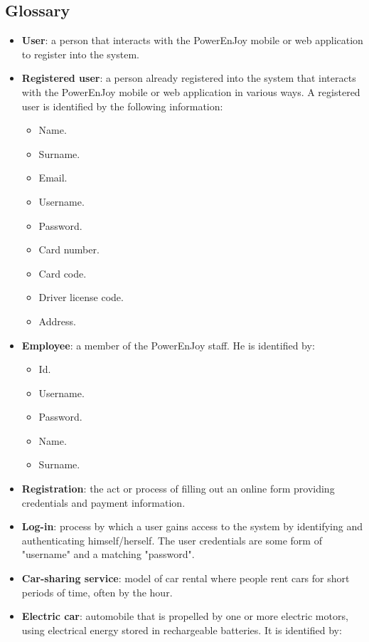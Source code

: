 \subsection{Glossary}
\begin{itemize}
	\item \textbf{User}: a person that interacts with the PowerEnJoy mobile or web application to register into the system.
	\item \textbf{Registered user}: a person already registered into the system that interacts with the PowerEnJoy mobile or web application in various ways. A registered user is identified by the following information:
	\begin{itemize}
		\item Name.
		\item Surname.
		\item Email.
		\item Username.
		\item Password.
		\item Card number.
		\item Card code.
		\item Driver license code.
		\item Address.
	\end{itemize}
	\item \textbf{Employee}: a member of the PowerEnJoy staff. He is identified by:
	\begin{itemize}
		\item Id.
		\item Username.
		\item Password.
		\item Name.
		\item Surname.
	\end{itemize}
	\item \textbf{Registration}: the act or process of filling out an online form providing credentials and payment information. 
	\item \textbf{Log-in}: process by which a user gains access to the system by identifying and authenticating himself/herself. The user credentials are some form of "username" and a matching "password".
	\item \textbf{Car-sharing service}: model of car rental where people rent cars for short periods of time, often by the hour.
	\newpage
	\item \textbf{Electric car}: automobile that is propelled by one or more electric motors, using electrical energy stored in rechargeable batteries. It is identified by:

\end{itemize}
